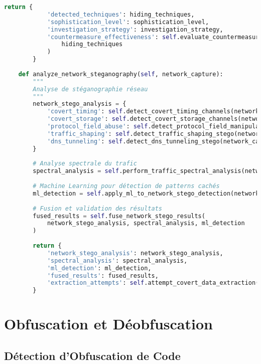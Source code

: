\begin{lstlisting}[language=Python, caption=Système de détection de stéganographie multi-domaine]
        return {
            'detected_techniques': hiding_techniques,
            'sophistication_level': sophistication_level,
            'investigation_strategy': investigation_strategy,
            'countermeasure_effectiveness': self.evaluate_countermeasure_effectiveness(
                hiding_techniques
            )
        }
    
    def analyze_network_steganography(self, network_capture):
        """
        Analyse de stéganographie réseau
        """
        network_stego_analysis = {
            'covert_timing': self.detect_covert_timing_channels(network_capture),
            'covert_storage': self.detect_covert_storage_channels(network_capture),
            'protocol_field_abuse': self.detect_protocol_field_manipulation(network_capture),
            'traffic_shaping': self.detect_traffic_shaping_stego(network_capture),
            'dns_tunneling': self.detect_dns_tunneling_stego(network_capture)
        }
        
        # Analyse spectrale du trafic
        spectral_analysis = self.perform_traffic_spectral_analysis(network_capture)
        
        # Machine Learning pour détection de patterns cachés
        ml_detection = self.apply_ml_to_network_stego_detection(network_capture)
        
        # Fusion et validation des résultats
        fused_results = self.fuse_network_stego_results(
            network_stego_analysis, spectral_analysis, ml_detection
        )
        
        return {
            'network_stego_analysis': network_stego_analysis,
            'spectral_analysis': spectral_analysis,
            'ml_detection': ml_detection,
            'fused_results': fused_results,
            'extraction_attempts': self.attempt_covert_data_extraction(fused_results)
        }
\end{lstlisting}

\section{Obfuscation et Déobfuscation}

\subsection{Détection d'Obfuscation de Code}

